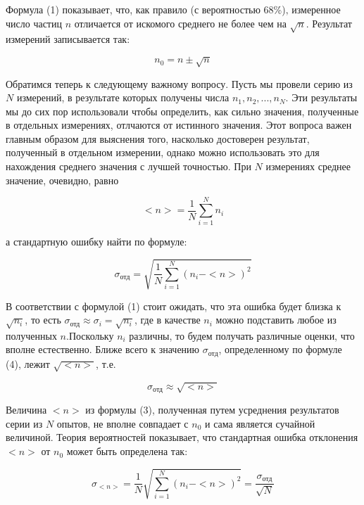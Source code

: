 \documentclass[14pt]{article}
\begin{document}
Формула (1) показывает, что, как правило (с вероятностью 68\%)‚ измеренное число частиц $n$ отличается от искомого среднего не более чем
на $\sqrt{n}$. Результат измерений записывается так:

\begin{equation}
n_0 = n \pm \sqrt{n}
\end{equation}

Обратимся теперь к следующему важному вопросу. Пусть мы провели серию из $N$ измерений, в результате которых получены числа 
$n_1, n_2,..., n_N$. Эти результаты мы до сих пор использовали чтобы определить, как сильно значения, полученные в отдельных измерениях, отлчаются от истинного значения. Этот вопроса важен главным образом для выяснения того, насколько достоверен результат, полученный в отдельном измерении, однако можно использовать это для нахождения среднего значения с лучшей точностью. При $N$ измерениях среднее значение, очевидно, равно

\begin{equation}
<n> = \frac{1}{N} \sum_{i = 1}^N n_i
\end{equation}

\noindent а стандартную ошибку найти по формуле:

\begin{equation}
\sigma_{\text{отд}} = \sqrt{\frac{1}{N} \sum_{i = 1}^N (n_i - <n>)^2}
\end{equation}

В соответствии с формулой (1) стоит ожидать, что эта ошибка будет близка к $\sqrt{n_i}$, то есть 
$\sigma_{\text{отд}} \approx \sigma_i = \sqrt{n_i}$, где в качестве $n_i$ можно подставить любое из полученных $n$.Поскольку $n_i$ различны, то будем получать различные оценки, что вполне естественно. Ближе всего к значению $\sigma_{\text{отд}}$, определенному по формуле (4), лежит 
$\sqrt{<n>}$, т.е.

\begin{equation}
\sigma_{\text{отд}} \approx \sqrt{<n>}
\end{equation}

Величина $<n>$ из формулы (3), полученная путем усреднения результатов серии из $N$ опытов, не вполне совпадает с $n_0$ и сама является сучайной величиной. Теория вероятностей показывает, что стандартная ошибка отклонения $<n>$ от $n_0$ может быть определена так:

\begin{equation}
\sigma_{<n>} = \frac{1}{N} \sqrt{\sum_{i = 1}^N (n_i - <n>)^2} = \frac{\sigma_{\text{отд}}}{\sqrt{N}}
\end{equation}
\end{document}

